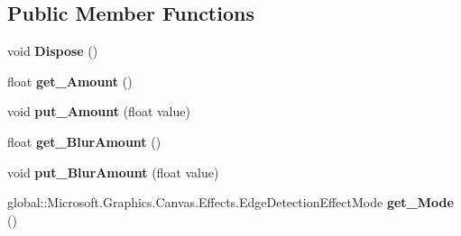 \subsection*{Public Member Functions}
\begin{DoxyCompactItemize}
\item 
\mbox{\label{class_microsoft_1_1_graphics_1_1_canvas_1_1_effects_1_1_edge_detection_effect_a4ef78a65aa6c4075fd46d5020462a100}} 
void {\bfseries Dispose} ()
\item 
\mbox{\label{class_microsoft_1_1_graphics_1_1_canvas_1_1_effects_1_1_edge_detection_effect_abb9b39bb3406ac6a4e812bd40512b749}} 
float {\bfseries get\+\_\+\+Amount} ()
\item 
\mbox{\label{class_microsoft_1_1_graphics_1_1_canvas_1_1_effects_1_1_edge_detection_effect_a35679bc6700b81e40b2e61ff0a065a2e}} 
void {\bfseries put\+\_\+\+Amount} (float value)
\item 
\mbox{\label{class_microsoft_1_1_graphics_1_1_canvas_1_1_effects_1_1_edge_detection_effect_ae48b3056466454ff45406d2d9be05f6b}} 
float {\bfseries get\+\_\+\+Blur\+Amount} ()
\item 
\mbox{\label{class_microsoft_1_1_graphics_1_1_canvas_1_1_effects_1_1_edge_detection_effect_a73881826da0680e80bc3fabfb027cfd7}} 
void {\bfseries put\+\_\+\+Blur\+Amount} (float value)
\item 
\mbox{\label{class_microsoft_1_1_graphics_1_1_canvas_1_1_effects_1_1_edge_detection_effect_a6c501576c1a32800807da3e3b7750015}} 
global\+::\+Microsoft.\+Graphics.\+Canvas.\+Effects.\+Edge\+Detection\+Effect\+Mode {\bfseries get\+\_\+\+Mode} ()
\item 
\mbox{\label{class_microsoft_1_1_graphics_1_1_canvas_1_1_effects_1_1_edge_detection_effect_a6f2ec4b23f0bd052e66ab4f0520145d5}} 

\end{DoxyCompactItemize}
